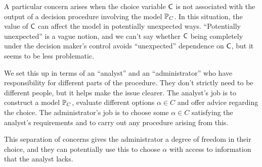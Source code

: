 A particular concern arises when the choice variable $\mathsf{C}$ is not associated with the output of a decision procedure involving the model $\mathbb{P}_C$. In this situation, the value of $\mathsf{C}$ can affect the model in potentially unexpected ways. ``Potentially unexpected'' is a vague notion, and we can't say whether $\mathsf{C}$ being completely under the decision maker's control avoids ``unexpected'' dependence on $\mathsf{C}$, but it seems to be less problematic.

We set this up in terms of an ``analyst'' and an ``administrator'' who have responsibility for different parts of the procedure. They don't strictly need to be different people, but it helps make the issue clearer. The analyst's job is to construct a model $\mathbb{P}_C$, evaluate different options $\alpha\in C$ and offer advice regarding the choice. The administrator's job is to choose some $\alpha\in C$ satisfying the analyst's requirements and to carry out any procedure arising from this.

This separation of concerns gives the administrator a degree of freedom in their choice, and they can potentially use this to choose $\alpha$ with access to information that the analyst lacks.

